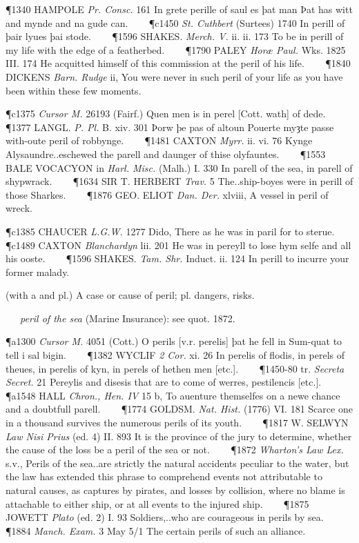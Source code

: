 \begin{description}[wide, labelwidth=!, labelindent=0pt]
\begin{myenumerate}
\P 1340 HAMPOLE  \textit{Pr. Consc.} 161 In grete perille of saul es þat man Þat has witt and mynde and na gude can.    
\P c1450  \textit{St. Cuthbert} (Surtees) 1740 In perill  of þair lyues þai stode.    
\P 1596 SHAKES.  \textit{Merch. V.} ii. ii. 173 To be in perill of my life with the edge of a featherbed.    
\P 1790 PALEY  \textit{Horæ Paul.} Wks. 1825 III.  174 He acquitted himself of this commission at the peril of his life.    
\P 1840 DICKENS  \textit{Barn. Rudge} ii, You were never in such peril of your life as you have been within these few moments.

\P c1375  \textit{Cursor M.} 26193 (Fairf.) Quen men is in perel [Cott. wath] of dede.    
\P 1377 LANGL.  \textit{P. Pl.} B. xiv. 301 Þorw þe pas of altoun Pouerte myȝte passe with-oute peril of robbynge.    
\P 1481 CAXTON  \textit{Myrr.} ii. vi. 76 Kynge Alysaundre..eschewed the parell and daunger of thise olyfauntes.    
\P 1553 BALE VOCACYON in  \textit{Harl. Misc.} (Malh.) I. 330 In parell of the sea, in parell of shypwrack.    
\P 1634 SIR T. HERBERT  \textit{Trav.} 5 The..ship-boyes were in perill of those Sharkes.    
\P 1876 GEO. ELIOT  \textit{Dan. Der.} xlviii, A vessel in peril of wreck.

\P c1385 CHAUCER \textit{L.G.W.} 1277 Dido, There as he was in paril for to sterue.
\P c1489 CAXTON  \textit{Blanchardyn} lii. 201 He was in pereyll to lose hym selfe and all his ooste.    
\P 1596 SHAKES.  \textit{Tam. Shr.} Induct. ii. 124 In perill to incurre your former malady.

 (with a and pl.) A case or cause of peril; pl. dangers, risks.

   \textit{peril of the sea} (Marine Insurance): see quot. 1872.

\P a1300  \textit{Cursor M.} 4051 (Cott.) O perils [v.r. perelis] þat he fell in Sum-quat to tell i sal bigin.    
\P 1382 WYCLIF  \textit{2 Cor.} xi. 26 In perelis of flodis, in perels of theues, in perelis of kyn, in perels of hethen men [etc.].    
\P 1450-80 tr.  \textit{Secreta Secret.} 21 Pereylis and disesis that are to come of werres, pestilencis [etc.].    
\P a1548 HALL  \textit{Chron., Hen. IV} 15 b, To auenture themselfes on a newe chance and a doubtfull parell.    
\P 1774 GOLDSM.  \textit{Nat. Hist.} (1776) VI. 181 Scarce one in a thousand survives the numerous perils of its youth.    
\P 1817 W. SELWYN  \textit{Law Nisi Prius} (ed. 4) II. 893 It is the province of the jury to determine, whether the cause of the loss be a peril of the sea or not.    
\P 1872 \textit{Wharton's  Law Lex.} s.v., Perils of the sea..are strictly the natural accidents peculiar to the water, but the law has extended this phrase to comprehend events not attributable to natural causes, as captures by pirates, and losses by collision, where no blame is attachable to either ship, or at all events to the injured ship.    
\P 1875 JOWETT  \textit{Plato} (ed. 2) I. 93 Soldiers,..who are courageous in perils by sea.    
\P 1884  \textit{Manch. Exam.} 3 May 5/1 The certain perils of such an alliance.


\end{myenumerate}
\end{description}

